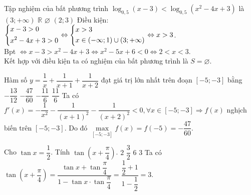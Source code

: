 \begin{ex}%
	Tập nghiệm của bất phương trình $\log_{0{,}5}\left(x-3\right)<\log_{0{,}5}\left(x^2-4x+3\right)$ là
	\choice
		{$\left(3;+\infty \right)$}
		{$\mathbb{R}$}
		{\True $\varnothing $}
		{$\left(2;3\right)$}
	\loigiai
		{
			Điều kiện: $\left\{\begin{aligned}
				& x-3>0 \\ 
				& x^2-4x+3>0\end{aligned}\right.\Leftrightarrow \left\{\begin{aligned}
				& x>3 \\ 
				& x\in \left(-\infty;1\right)\cup \left(3;+\infty \right)\end{aligned}\right.\Leftrightarrow x>3$. \\
			Bpt $\Leftrightarrow x-3>x^2-4x+3\Leftrightarrow x^2-5x+6<0\Leftrightarrow 2<x<3$. \\
			Kết hợp với điều kiện ta có nghiệm của bất phương trình là $S=\varnothing$.
		}
\end{ex}

\begin{ex}%
	Hàm số $y=\dfrac{1}{x}+\dfrac{1}{x+1}+\dfrac{1}{x+2}$ đạt giá trị lớn nhất trên đoạn $\left[-5;-3\right]$ bằng
	\choice
		{$-\dfrac{13}{12}$}
		{\True $-\dfrac{47}{60}$}
		{$-\dfrac{11}{6}$}
		{$\dfrac{11}{6}$}
	\loigiai
		{
			Ta có $f'(x)=-\dfrac{1}{x^2}-\dfrac{1}{(x+1)^2}-\dfrac{1}{(x+2)^2}<0, \forall x \in [-5;-3] \Rightarrow f(x)$ nghịch biến trên $[-5;-3]$. Do đó $\max \limits_{[-5;-3]} f(x) = f(-5) = -\dfrac{47}{60}$.
		}
\end{ex}

\begin{ex}%
	Cho $\tan x=\dfrac{1}{2}$. Tính $\tan \left(x+\dfrac{\pi}{4}\right)$.
	\choice
		{$2$}
		{$\dfrac{3}{2}$}
		{$6$}
		{\True $3$}
	\loigiai
		{
			Ta có $\tan \left(x+\dfrac{\pi}{4}\right)=\dfrac{\tan x+\tan \dfrac{\pi}{4}}{1-\tan x\cdot \tan \dfrac{\pi}{4}}=\dfrac{\dfrac{1}{2}+1}{1-\dfrac{1}{2}} = 3$.
		}
\end{ex}

